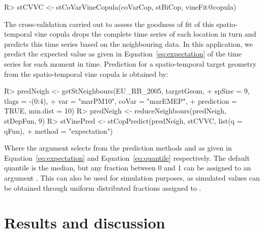 \documentclass[article,nojss]{jss}
\begin{document}
\begin{Schunk}
\begin{Sinput}
R> stCVVC <- stCoVarVineCopula(coVarCop, stBiCop, vineFit@copula)
\end{Sinput}
\end{Schunk}

The cross-validation carried out to assess the goodness of fit of this spatio-temporal vine copula drops the complete time series of each location in turn and predicts this time series based on the neighbouring data. In this application, we predict the expected value as given in Equation~\ref{eq:expectation} of the time series for each moment in time. Prediction for a spatio-temporal target geometry  from the spatio-temporal vine copula is obtained by:

\begin{Schunk}
\begin{Sinput}
R> predNeigh <- getStNeighbours(EU_RB_2005, targetGeom, 
+                               spSize = 9, tlags = -(0:4),
+                               var = "marPM10", coVar = "marEMEP",
+                               prediction = TRUE, min.dist = 10)
R> predNeigh <- reduceNeighbours(predNeigh, stDepFun, 9)
R> stVinePred <- stCopPredict(predNeigh, stCVVC, list(q = qFun), 
+                             method = "expectation")
\end{Sinput}
\end{Schunk}

Where the argument  selects from the prediction methods  and  as given in Equation~\ref{eq:expectation} and Equation~\ref{eq:quantile} respectively. The default quantile is the median, but any fraction between 0 and 1 can be assigned to an argument . This can also be used for simulation purposes, as simulated values can be obtained through uniform distributed fractions assigned to .

\section{Results and discussion}
\label{sec:discussion}
\end{document}
